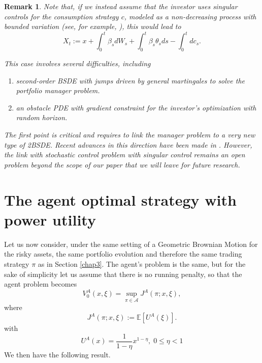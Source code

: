 \documentclass[11pt,a4paper]{article}
\theoremstyle{thmstyleone}%
\theoremstyle{thmstyletwo}%
\newtheorem{remark}{Remark}%
\theoremstyle{thmstylethree}%
\begin{document}
\begin{remark}
Note that, if we instead assume that the investor uses singular controls for the consumption strategy $c$, modeled as a non-decreasing process with bounded variation (see, for example, \cite{shreve1994optimal}), this would lead to
\[ X_t:= x + \int_0^t \beta_s dW_s + \int_0^t \beta_s \theta_s ds -\int_0^t dc_s.
\]

This case involves several difficulties, including 
\begin{enumerate}
\item second-order BSDE with jumps driven by general martingales to solve the portfolio manager problem.  
\item an obstacle PDE with gradient constraint for the investor's optimization with random horizon. 
\end{enumerate}
The first point is critical and requires to link the manager problem to a very new type of 2BSDE. Recent advances in this direction have been made in \cite{possamai2025mind}. However, the link with stochastic control problem with singular control remains an open problem beyond the scope of our paper that we will leave for future research. 
\end{remark}

\section{The agent optimal strategy with power utility}\label{AppendixPower}
Let us now consider, under the same setting of a Geometric Brownian Motion for the risky assets, the same portfolio evolution and therefore the same trading strategy $\pi$ as in Section \ref{chap3}. The agent's problem is the same, but for the sake of simplicity let us assume that there is no running penalty, so that the agent problem becomes
\begin{equation}\label{pbPowerAgent}  \tag{Power-A} V^A_0(x,\xi)=\sup_{\pi\in \mathcal A} J^A(\pi;x,\xi),\end{equation}
where
\[J^A(\pi;x,\xi):=\mathbb E[ U^A(\xi)].\]
with 
\[
    U^A(x) = \frac{1}{1-\eta}x^{1-\eta},\; 0\leq \eta<1
\]
We then have the following result.
\end{document}
